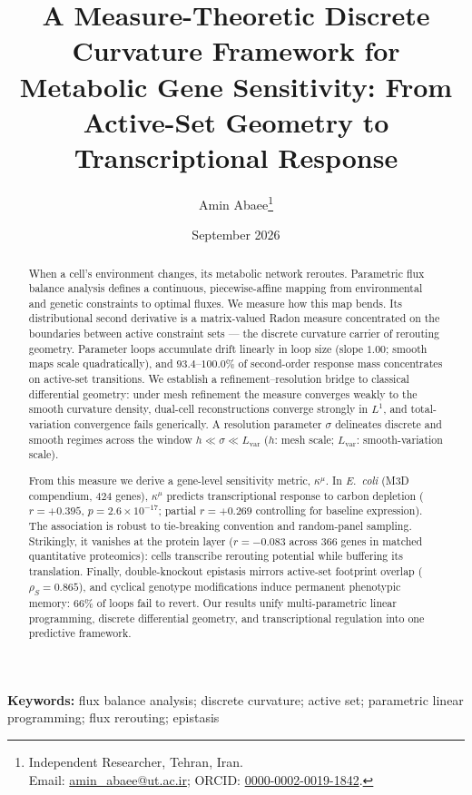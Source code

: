 \documentclass[11pt,a4paper]{article}
\title{A Measure-Theoretic Discrete Curvature Framework for Metabolic
       Gene Sensitivity: From Active-Set Geometry to Transcriptional
       Response}
\author{Amin Abaee\thanks{Independent Researcher, Tehran, Iran.\\
  Email: \href{mailto:amin_abaee@ut.ac.ir}{amin\_abaee@ut.ac.ir}; ORCID:
  \href{https://orcid.org/0000-0002-0019-1842}{0000-0002-0019-1842}.}}
\date{September 2026}
\theoremstyle{plain}
\theoremstyle{definition}
\theoremstyle{remark}
\newcommand{\kmu}{\kappa^{\mu}}
\begin{document}
\linenumbers
\maketitle

\begin{abstract}
\noindent
When a cell's environment changes, its metabolic network reroutes.
Parametric flux balance analysis defines a continuous, piecewise-affine
mapping from environmental and genetic constraints to optimal fluxes.
We measure how this map bends. Its distributional second derivative
is a matrix-valued Radon measure concentrated on the boundaries
between active constraint sets --- the discrete curvature carrier of
rerouting geometry. Parameter loops accumulate drift linearly in loop
size (slope $1.00$; smooth maps scale quadratically), and $93.4$--$100.0\%$
of second-order response mass concentrates on active-set transitions.
We establish a refinement--resolution bridge to classical differential
geometry: under mesh refinement the measure converges weakly to the
smooth curvature density, dual-cell reconstructions converge strongly
in $L^1$, and total-variation convergence fails generically. A
resolution parameter $\sigma$ delineates discrete and smooth regimes
across the window $h \ll \sigma \ll L_{\mathrm{var}}$
($h$: mesh scale; $L_{\mathrm{var}}$: smooth-variation scale).

From this measure we derive a gene-level sensitivity metric, $\kmu$.
In \emph{E.~coli} (M3D compendium, $424$ genes), $\kmu$ predicts
transcriptional response to carbon depletion ($r = +0.395$,
$p = 2.6 \times 10^{-17}$; partial $r = +0.269$ controlling for
baseline expression). The association is robust to tie-breaking
convention and random-panel sampling. Strikingly, it vanishes at
the protein layer ($r = -0.083$ across $366$ genes in matched
quantitative proteomics): cells transcribe rerouting potential while
buffering its translation. Finally, double-knockout epistasis mirrors
active-set footprint overlap ($\rho_S = 0.865$), and cyclical genotype
modifications induce permanent phenotypic memory: $66\%$ of loops fail
to revert. Our results unify multi-parametric linear programming,
discrete differential geometry, and transcriptional regulation into
one predictive framework.
\end{abstract}

\medskip
\noindent\textbf{Keywords:} flux balance analysis; discrete curvature;
active set; parametric linear programming; flux rerouting; epistasis

\bigskip
\end{document}
